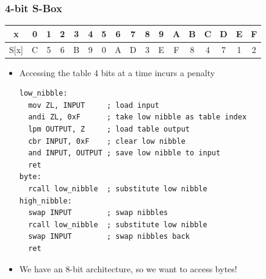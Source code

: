 \documentclass{beamer}
\begin{document}
\begin{frame}[fragile]
\frametitle{4-bit S-Box}
  \begin{tabular}{ | c | c | c | c | c | c | c | c | c | c | c | c | c | c | c | c | c | }
    \hline                        
       x & 0 & 1 & 2 & 3 & 4 & 5 & 6 & 7 & 8 & 9 & A & B & C & D & E & F \\
    \hline                        
    S[x] & C & 5 & 6 & B & 9 & 0 & A & D & 3 & E & F & 8 & 4 & 7 & 1 & 2 \\
    \hline  
  \end{tabular}
\pause
\begin{itemize}[<+->]
\item Accessing the table 4 bits at a time incurs a penalty

  \begin{lstlisting}
low_nibble:
  mov ZL, INPUT     ; load input
  andi ZL, 0xF      ; take low nibble as table index
  lpm OUTPUT, Z     ; load table output
  cbr INPUT, 0xF    ; clear low nibble
  and INPUT, OUTPUT ; save low nibble to input
  ret
byte:
  rcall low_nibble  ; substitute low nibble
high_nibble:
  swap INPUT        ; swap nibbles
  rcall low_nibble  ; substitute low nibble
  swap INPUT        ; swap nibbles back
  ret
  \end{lstlisting}
\item We have an 8-bit architecture, so we want to access bytes!
\end{itemize}
\end{frame}
\end{document}
